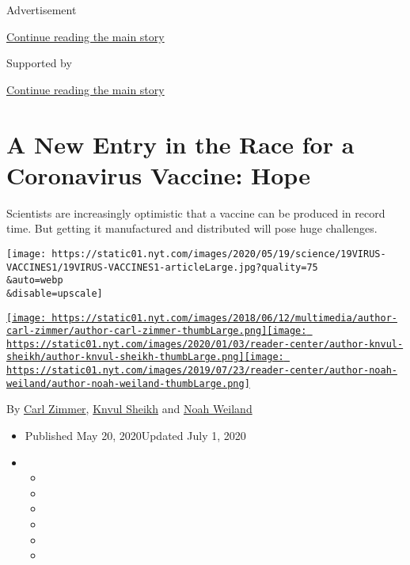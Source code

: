 Advertisement

\protect\hyperlink{after-top}{Continue reading the main story}

Supported by

\protect\hyperlink{after-sponsor}{Continue reading the main story}

\hypertarget{a-new-entry-in-the-race-for-a-coronavirus-vaccine-hope}{%
\section{A New Entry in the Race for a Coronavirus Vaccine:
Hope}\label{a-new-entry-in-the-race-for-a-coronavirus-vaccine-hope}}

Scientists are increasingly optimistic that a vaccine can be produced in
record time. But getting it manufactured and distributed will pose huge
challenges.

\texttt{[image: https://static01.nyt.com/images/2020/05/19/science/19VIRUS-VACCINES1/19VIRUS-VACCINES1-articleLarge.jpg?quality=75\\\&auto=webp\\\&disable=upscale]}

\href{https://www.nytimes.com/by/carl-zimmer}{\texttt{[image: https://static01.nyt.com/images/2018/06/12/multimedia/author-carl-zimmer/author-carl-zimmer-thumbLarge.png]}}\href{https://www.nytimes.com/by/knvul-sheikh}{\texttt{[image: https://static01.nyt.com/images/2020/01/03/reader-center/author-knvul-sheikh/author-knvul-sheikh-thumbLarge.png]}}\href{https://www.nytimes.com/by/noah-weiland}{\texttt{[image: https://static01.nyt.com/images/2019/07/23/reader-center/author-noah-weiland/author-noah-weiland-thumbLarge.png]}}

By \href{https://www.nytimes.com/by/carl-zimmer}{Carl Zimmer},
\href{https://www.nytimes.com/by/knvul-sheikh}{Knvul Sheikh} and
\href{https://www.nytimes.com/by/noah-weiland}{Noah Weiland}

\begin{itemize}
\item
  Published May 20, 2020Updated July 1, 2020
\item
  \begin{itemize}
  \item
  \item
  \item
  \item
  \item
  \item
  \end{itemize}
\end{itemize}

